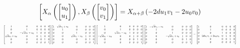 \documentclass[11pt]{article}
\theoremstyle{definition}
\begin{document}
\[
\scaletoalign{\textwidth}{\left[ X_{\alpha}\left(\left[\begin{matrix}u_{0}\\u_{1}\end{matrix}\right]\right), X_{\beta}\left(\left[\begin{matrix}v_{0}\\v_{1}\end{matrix}\right]\right) \right] = X_{\alpha + \beta}\left(- 2 d u_{1} v_{1} - 2 u_{0} v_{0}\right)}
\]
\[
\scaletoalign{\textwidth}{{\left[\begin{matrix}1 & 0 & 0 & 0 & 0 & 0\\0 & 1 & 0 & 0 & 0 & 0\\0 & - \sqrt{d} u_{1} + u_{0} & 1 & 0 & 0 & 0\\\sqrt{d} u_{1} + u_{0} & 0 & 0 & 1 & 0 & 0\\0 & 0 & 0 & 0 & 1 & 0\\0 & 0 & 0 & 0 & 0 & 1\end{matrix}\right]} {\left[\begin{matrix}1 & \sqrt{d} v_{1} + v_{0} & 0 & 0 & 0 & 0\\0 & 1 & 0 & 0 & 0 & 0\\0 & 0 & 1 & 0 & 0 & 0\\0 & 0 & \sqrt{d} v_{1} - v_{0} & 1 & 0 & 0\\0 & 0 & 0 & 0 & 1 & 0\\0 & 0 & 0 & 0 & 0 & 1\end{matrix}\right]} {\left[\begin{matrix}1 & 0 & 0 & 0 & 0 & 0\\0 & 1 & 0 & 0 & 0 & 0\\0 & \sqrt{d} u_{1} - u_{0} & 1 & 0 & 0 & 0\\- \sqrt{d} u_{1} - u_{0} & 0 & 0 & 1 & 0 & 0\\0 & 0 & 0 & 0 & 1 & 0\\0 & 0 & 0 & 0 & 0 & 1\end{matrix}\right]} {\left[\begin{matrix}1 & - \sqrt{d} v_{1} - v_{0} & 0 & 0 & 0 & 0\\0 & 1 & 0 & 0 & 0 & 0\\0 & 0 & 1 & 0 & 0 & 0\\0 & 0 & - \sqrt{d} v_{1} + v_{0} & 1 & 0 & 0\\0 & 0 & 0 & 0 & 1 & 0\\0 & 0 & 0 & 0 & 0 & 1\end{matrix}\right]} = {\left[\begin{matrix}1 & 0 & 0 & 0 & 0 & 0\\0 & 1 & 0 & 0 & 0 & 0\\0 & 0 & 1 & 0 & 0 & 0\\0 & 2 d u_{1} v_{1} + 2 u_{0} v_{0} & 0 & 1 & 0 & 0\\0 & 0 & 0 & 0 & 1 & 0\\0 & 0 & 0 & 0 & 0 & 1\end{matrix}\right]}}
\]
\end{document}
